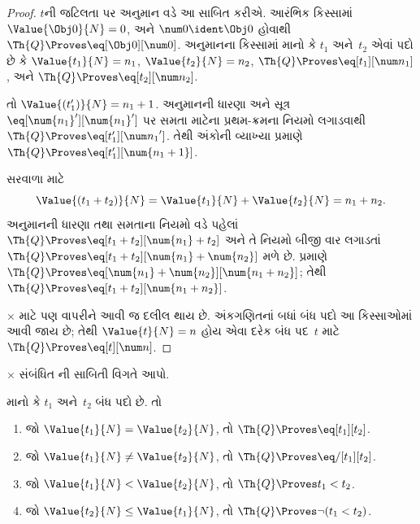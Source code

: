 \begin{proof}
$t$ની જટિલતા પર અનુમાન
વડે આ સાબિત કરીએ.
આરંભિક કિસ્સામાં
$\Value{\Obj 0}{N} = 0$,
અને $\num 0 \ident \Obj 0$
હોવાથી
$\Th{Q} \Proves \eq[\Obj 0][\num 0]$.
અનુમાનના કિસ્સામાં માનો કે
$t_1$ અને~$t_2$ એવાં પદો છે કે
$\Value{t_1}{N} = n_1$,
$\Value{t_2}{N} = n_2$,
$\Th{Q} \Proves \eq[t_1][\num n_1]$,
અને $\Th{Q} \Proves
\eq[t_2][\num n_2]$.

તો $\Value{(t_1')}{N} = n_1 + 1$.
અનુમાનની ધારણા અને
સૂત્ર~$\eq[\num{n_1}'][\num{n_1}']$
પર સમતા માટેના પ્રથમ-ક્રમના
નિયમો લગાડવાથી
$\Th{Q} \Proves
\eq[t_1'][{\num n_1}']$.
તેથી અંકોની વ્યાખ્યા પ્રમાણે
$\Th{Q} \Proves
\eq[t_1'][\num{n_1 + 1}]$.

સરવાળા માટે
\[
      \Value{(t_1 + t_2)}{N}
    = \Value{t_1}{N} + \Value{t_2}{N}
    = n_1 + n_2.
\]
અનુમાનની ધારણા તથા
સમતાના નિયમો વડે પહેલાં
$\Th{Q} \Proves
\eq[t_1 + t_2][\num{n_1} + t_2]$
અને તે નિયમો બીજી વાર
લગાડતાં
$\Th{Q} \Proves
\eq[t_1 + t_2][\num{n_1} + \num{n_2}]$
મળે છે.
પ્રમાણે
$\Th{Q} \Proves
\eq[\num{n_1} + \num{n_2}][\num{n_1 + n_2}]$;
તેથી $\Th{Q} \Proves
\eq[t_1 + t_2][\num{n_1 + n_2}]$.

$\times$ માટે પણ
વાપરીને આવી જ દલીલ થાય છે.
અંકગણિતનાં બધાં બંધ પદો
આ કિસ્સાઓમાં આવી જાય છે;
તેથી $\Value{t}{N} = n$
હોય એવા દરેક બંધ પદ~$t$
માટે $\Th{Q} \Proves
\eq[t][\num n]$.
\end{proof}
 
\begin{prob}
$\times$ સંબંધિત
ની
સાબિતી વિગતે આપો.
\end{prob}

\begin{lem}
માનો કે $t_1$ અને~$t_2$
બંધ પદો છે. તો
\begin{enumerate}
\item જો $\Value{t_1}{N} = \Value{t_2}{N}$,
    તો $\Th{Q} \Proves \eq[t_1][t_2]$.
\item જો $\Value{t_1}{N} \neq \Value{t_2}{N}$,
    તો $\Th{Q} \Proves \eq/[t_1][t_2]$.
\item જો $\Value{t_1}{N} < \Value{t_2}{N}$,
    તો $\Th{Q} \Proves t_1 < t_2$.
\item જો $\Value{t_2}{N} \leq \Value{t_1}{N}$,
    તો $\Th{Q} \Proves \lnot(t_1 < t_2)$.
\end{enumerate}
\end{lem}

